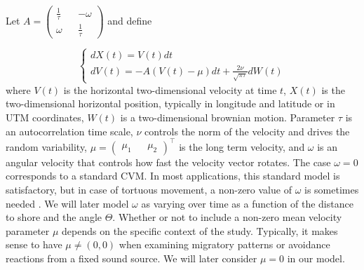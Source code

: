 \documentclass[aoas]{imsart}
\theoremstyle{definition}
\theoremstyle{remark}
\theoremstyle{remark}
\newcommand {\1}{\mathbb{1}}
\begin{document}
Let $A=\begin{pmatrix} 
	\frac{1}{\tau} &&-\omega \\
	\omega && \frac{1}{\tau}
\end{pmatrix}$ and define

\begin{equation} \left\{
	\begin{array}{l}
		dX(t)=V(t)dt \\
		dV(t)=-A(V(t)-\mu)dt+\frac{2\nu}{\sqrt{\pi \tau}} dW(t) 
	\end{array}
	\right.
	\label{eq: RACVM equation}
\end{equation}
where $V(t)$ is the horizontal two-dimensional velocity at time $t$, $X(t)$ is the two-dimensional horizontal position, typically in longitude and latitude or in UTM coordinates, $W(t)$ is a two-dimensional brownian motion. Parameter $\tau$ is an autocorrelation time scale, $\nu$ controls the norm of the velocity and drives the random variability, $\mu=\begin{pmatrix} \mu_1 && \mu_2 \end{pmatrix}^\top$ is the long term velocity, and $\omega$ is an angular velocity that controls how fast the velocity vector rotates. The case $\omega=0$ corresponds to a standard CVM. In most applications, this standard model is satisfactory, but in case of tortuous movement, a non-zero value of $\omega$ is sometimes needed \citep{gurarie_correlated_2017,alt_correlation_1990,albertsen_generalizing_2018}. We will later model $\omega$ as varying over time as a function of the distance to shore and the angle $\Theta$. Whether or not to include a non-zero mean velocity parameter $\mu$ depends on the specific context of the study. Typically, it makes sense to have $\mu\neq (0,0)$ when examining migratory patterns or avoidance reactions from a fixed sound source. We will later consider $\mu=0$ in our model.\\
\end{document}
